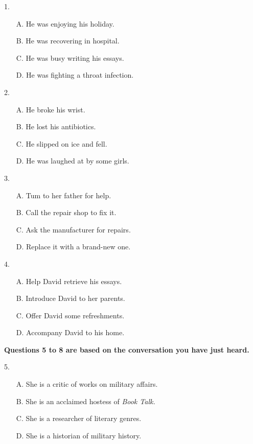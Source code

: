 \documentclass[UTF8,11pt]{ctexart}
\begin{document}
1.


\begin{itemize}[leftmargin=2em,itemsep=.2em,topsep=.4em]\item[A.] He was enjoying his holiday.
\item[B.] He was recovering in hospital.
\item[C.] He was busy writing his essays.
\item[D.] He was fighting a throat infection.
\end{itemize}

2.


\begin{itemize}[leftmargin=2em,itemsep=.2em,topsep=.4em]\item[A.] He broke his wrist.
\item[B.] He lost his antibiotics.
\item[C.] He slipped on ice and fell.
\item[D.] He was laughed at by some girls.
\end{itemize}

3.


\begin{itemize}[leftmargin=2em,itemsep=.2em,topsep=.4em]\item[A.] Tum to her father for help.
\item[B.] Call the repair shop to fix it.
\item[C.] Ask the manufacturer for repairs.
\item[D.] Replace it with a brand-new one.
\end{itemize}

4.


\begin{itemize}[leftmargin=2em,itemsep=.2em,topsep=.4em]\item[A.] Help David retrieve his essays.
\item[B.] Introduce David to her parents.
\item[C.] Offer David some refreshments.
\item[D.] Accompany David to his home.
\end{itemize}

\textbf{Questions 5 to 8 are based on the conversation you have just heard.}


5.


\begin{itemize}[leftmargin=2em,itemsep=.2em,topsep=.4em]\item[A.] She is a critic of works on military affairs.
\item[B.] She is an acclaimed hostess of \textit{Book Talk.}
\item[C.] She is a researcher of literary genres.
\item[D.] She is a historian of military history.
\end{itemize}
\end{document}
